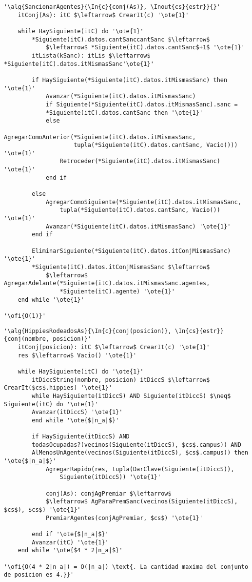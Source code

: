 \begin{lstlisting}[mathescape]
'\alg{SancionarAgentes}{\In{c}{conj(As)}, \Inout{cs}{estr}}{}'
	itConj(As): itC $\leftarrow$ CrearIt(c) '\ote{1}'

	while HaySiguiente(itC) do '\ote{1}'
		*Siguiente(itC).datos.cantSanccantSanc $\leftarrow$
			$\leftarrow$ *Siguiente(itC).datos.cantSanc$+1$ '\ote{1}'
		itLista(kSanc): itLis $\leftarrow$ *Siguiente(itC).datos.itMismasSanc'\ote{1}'

		if HaySiguiente(*Siguiente(itC).datos.itMismasSanc) then '\ote{1}'
			Avanzar(*Siguiente(itC).datos.itMismasSanc)
			if Siguiente(*Siguiente(itC).datos.itMismasSanc).sanc = 
			*Siguiente(itC).datos.cantSanc then '\ote{1}'
			else
				AgregarComoAnterior(*Siguiente(itC).datos.itMismasSanc,
					tupla(*Siguiente(itC).datos.cantSanc, Vacio())) '\ote{1}'
				Retroceder(*Siguiente(itC).datos.itMismasSanc) '\ote{1}'
			end if

		else
			AgregarComoSiguiente(*Siguiente(itC).datos.itMismasSanc,
				tupla(*Siguiente(itC).datos.cantSanc, Vacio()) '\ote{1}'
			Avanzar(*Siguiente(itC).datos.itMismasSanc) '\ote{1}'
		end if
		
		EliminarSiguiente(*Siguiente(itC).datos.itConjMismasSanc) '\ote{1}'
		*Siguiente(itC).datos.itConjMismasSanc $\leftarrow$
			$\leftarrow$ AgregarAdelante(*Siguiente(itC).datos.itMismasSanc.agentes, 
				*Siguiente(itC).agente) '\ote{1}'
	end while '\ote{1}'

'\ofi{O(1)}'
\end{lstlisting}

\begin{lstlisting}[mathescape]
'\alg{HippiesRodeadosAs}{\In{c}{conj(posicion)}, \In{cs}{estr}}{conj(nombre, posicion)}'
	itConj(posicion): itC $\leftarrow$ CrearIt(c) '\ote{1}'
	res $\leftarrow$ Vacio() '\ote{1}'

	while HaySiguiente(itC) do '\ote{1}'
		itDiccString(nombre, posicion) itDiccS $\leftarrow$ CrearIt($cs$.hippies) '\ote{1}'
		while HaySiguiente(itDiccS) AND Siguiente(itDiccS) $\neq$ Siguiente(itC) do '\ote{1}'
		Avanzar(itDiccS) '\ote{1}'
		end while '\ote{$|n_a|$}'

		if HaySiguiente(itDiccS) AND 
		todasOcupadas?(vecinos(Siguiente(itDiccS), $cs$.campus)) AND 
		AlMenosUnAgente(vecinos(Siguiente(itDiccS), $cs$.campus)) then '\ote{$|n_a|$}'
			AgregarRapido(res, tupla(DarClave(Siguiente(itDiccS)), 
				Siguiente(itDiccS)) '\ote{1}'

			conj(As): conjAgPremiar $\leftarrow$
			$\leftarrow$ AgParaPremSanc(vecinos(Siguiente(itDiccS), $cs$), $cs$) '\ote{1}'
			PremiarAgentes(conjAgPremiar, $cs$) '\ote{1}'

		end if '\ote{$|n_a|$}'
		Avanzar(itC) '\ote{1}'
	end while '\ote{$4 * 2|n_a|$}'

'\ofi{O(4 * 2|n_a|) = O(|n_a|) \text{. La cantidad maxima del conjunto de posicion es 4.}}'
\end{lstlisting}

